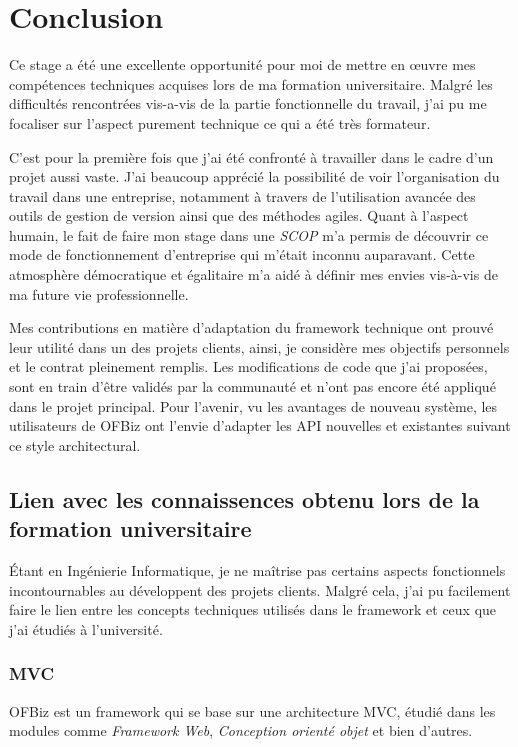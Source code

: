 \chapter{Conclusion}
Ce stage a été une excellente opportunité pour moi de mettre en œuvre mes compétences techniques acquises lors de ma formation universitaire. Malgré les difficultés rencontrées vis-a-vis de la partie fonctionnelle du travail, j'ai pu me focaliser sur l'aspect purement technique ce qui a été très formateur. 

C'est pour la première fois que j'ai été confronté à travailler dans le cadre d'un projet aussi vaste. J'ai beaucoup apprécié la possibilité de voir l'organisation du travail dans une entreprise, notamment à travers de l'utilisation avancée des outils de gestion de version ainsi que des méthodes agiles. Quant à l'aspect humain, le fait de faire mon stage dans une \emph{SCOP} m'a permis de découvrir ce mode de fonctionnement d'entreprise qui m'était inconnu auparavant. Cette atmosphère démocratique et égalitaire m'a aidé à définir mes envies vis-à-vis de ma future vie professionnelle.

Mes contributions en matière d'adaptation du framework technique ont prouvé leur utilité dans un des projets clients, ainsi, je considère mes objectifs personnels et le contrat pleinement remplis. Les modifications de code que j'ai proposées, sont en train d'être validés par la communauté et n'ont pas encore été appliqué dans le projet principal.
Pour l'avenir, vu les avantages de nouveau système, les utilisateurs de OFBiz ont l'envie d'adapter les API nouvelles et existantes suivant ce style architectural.



\section{Lien avec les connaissences obtenu lors de la formation universitaire}
Étant en Ingénierie Informatique, je ne maîtrise pas certains aspects fonctionnels incontournables au développent des projets clients. Malgré cela, j'ai pu facilement faire le lien entre les concepts techniques utilisés dans le framework et ceux que j'ai étudiés à l'université. 
\subsection{MVC}
OFBiz est un framework qui se base sur une architecture MVC, étudié dans les modules comme \emph{Framework Web}, \emph{Conception orienté objet} et bien d'autres. 
